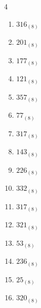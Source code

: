 \begin{multicols}{4}
\begin{enumerate}
  \item $316_{(8)}$

        \phantom{$=206$}

  \item $201_{(8)}$

        \phantom{$=129$}

  \item $177_{(8)}$

        \phantom{$=127$}

  \item $121_{(8)}$

        \phantom{$=81$}

  \item $357_{(8)}$

        \phantom{$=239$}

  \item $77_{(8)}$

        \phantom{$=63$}

  \item $317_{(8)}$

        \phantom{$=207$}

  \item $143_{(8)}$

        \phantom{$=99$}

\columnbreak %

  \item $226_{(8)}$

        \phantom{$=150$}

  \item $332_{(8)}$

        \phantom{$=218$}

  \item $317_{(8)}$

        \phantom{$=207$}

  \item $321_{(8)}$

        \phantom{$=209$}

  \item $53_{(8)}$

        \phantom{$=43$}

  \item $236_{(8)}$

        \phantom{$=158$}

  \item $25_{(8)}$

        \phantom{$=21$}

  \item $320_{(8)}$


\end{enumerate}
\end{multicols}
